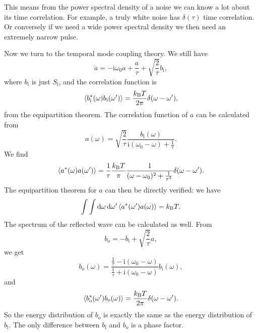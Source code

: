 \documentclass[hyperref, a4paper]{article}
\newcommand*{\ii}{\mathrm{i}}
\newcommand*{\kB}{k_{\text{B}}}
\newcommand*{\Si}{S_{\text{i}}}
\newcommand*{\bi}{b_{\text{i}}}
\newcommand*{\bo}{b_{\text{o}}}
\begin{document}
This means from the power spectral density of a noise 
we can know a lot about its time correlation.
For example, a truly white noise has $\delta(\tau)$ time correlation.
Or conversely if we need a wide power spectral density we then need an extremely narrow pulse.


Now we turn to the temporal mode coupling theory. 
We still have 
\begin{equation}
    \dot{a} = - \ii \omega_0 a + \frac{a}{\tau} + \sqrt{\frac{2}{\tau}} \bi,
\end{equation}
where $\bi$ is just $\Si$, 
and the correlation function is 
\begin{equation}
    \expval{\bi^*(\omega) \bi(\omega')} = \frac{\kB T}{2 \pi} \delta(\omega - \omega'),
\end{equation}
from the equipartition theorem. 
The correlation function of $a$ can be calculated from 
\begin{equation}
    a(\omega) = \sqrt{\frac{2}{\tau}} \frac{\bi(\omega)}{\ii (\omega_0 - \omega) + \frac{1}{\tau}}.
\end{equation} 
We find 
\begin{equation}
    \expval{a^*(\omega) a(\omega')} = \frac{1}{\tau} \frac{\kB T}{\pi} \frac{1}{(\omega - \omega_0)^2 + \frac{1}{\tau^2}} \delta(\omega - \omega').
\end{equation}
The equipartition theorem for $a$ can then be directly verified: we have 
\begin{equation}
    \int \int \dd{\omega} \dd{\omega'} \expval{a^*(\omega') a(\omega)} = \kB T.
\end{equation}
The spectrum of the reflected wave can be calculated as well. 
From 
\begin{equation}
    \bo = - \bi + \sqrt{\frac{2}{\tau}} a ,
\end{equation}
we get 
\begin{equation}
    \bo(\omega) = \frac{\frac{1}{\tau} - \ii (\omega_0 - \omega)}{\frac{1}{\tau} + \ii (\omega_0 - \omega)} \bi(\omega), 
\end{equation}
and 
\begin{equation}
    \expval{\bo^*(\omega') \bo(\omega)} = \frac{\kB T}{2 \pi} \delta(\omega - \omega').
\end{equation}
So the energy distribution of $\bo$ is exactly the same as the energy distribution of $\bi$.
The only difference between $\bi$ and $\bo$ is a phase factor.
\end{document}
